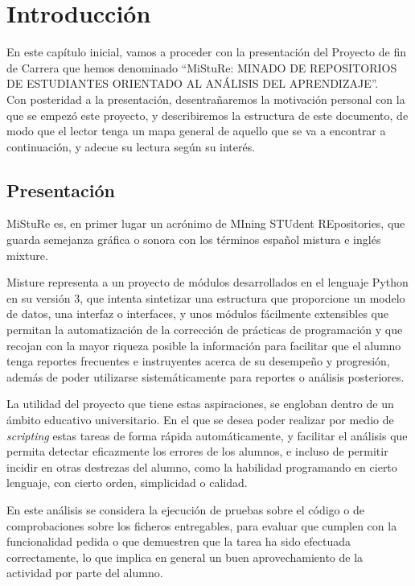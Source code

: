 \chapter{Introducción}
\label{sec:intro}

En este capítulo inicial, vamos a proceder con la presentación del Proyecto de fin de Carrera que hemos denominado “MiStuRe: MINADO DE REPOSITORIOS DE ESTUDIANTES ORIENTADO AL ANÁLISIS DEL APRENDIZAJE”.\\


Con posteridad a la presentación, desentrañaremos la motivación personal con la que se empezó este proyecto, y describiremos la estructura de este documento, de modo que el lector tenga un mapa general de aquello que se va a encontrar a continuación, y adecue su lectura según su interés.



\section{Presentación}

MiStuRe es, en primer lugar un acrónimo de MIning STUdent REpositories, que guarda semejanza gráfica o sonora con los términos español mistura e inglés mixture.


Misture representa a un proyecto de módulos desarrollados en el lenguaje Python en su versión 3, que intenta sintetizar una estructura que proporcione un modelo de datos, una interfaz o interfaces, y unos módulos fácilmente extensibles que permitan la automatización de la corrección de prácticas de programación y que recojan con la mayor riqueza posible la información para facilitar que el alumno tenga reportes frecuentes e instruyentes acerca de su desempeño y progresión, además de poder utilizarse sistemáticamente para reportes o análisis posteriores.


La utilidad del proyecto que tiene estas aspiraciones, se engloban dentro de un ámbito educativo universitario. En el que se desea poder realizar por medio de \textit{scripting} estas tareas de forma rápida automáticamente, y facilitar el análisis que permita detectar eficazmente los errores de los alumnos, e incluso de permitir incidir en otras destrezas del alumno, como la habilidad programando en cierto lenguaje, con cierto orden, simplicidad o calidad.


En este análisis se considera la ejecución de pruebas sobre el código o de comprobaciones sobre los ficheros entregables, para evaluar que cumplen con la funcionalidad pedida o que demuestren que la tarea ha sido efectuada correctamente, lo que implica en general un buen aprovechamiento de la actividad por parte del alumno.


